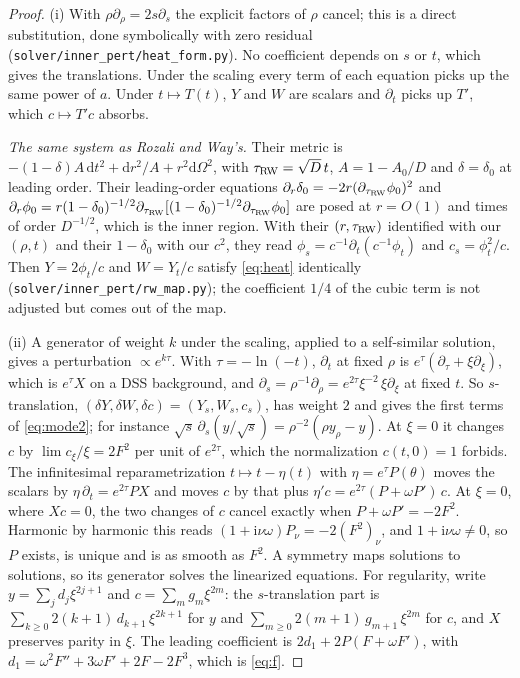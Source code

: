 \documentclass{amsart}
\numberwithin{equation}{section}
\theoremstyle{plain}
\theoremstyle{definition}
\theoremstyle{remark}
\newcommand{\iu}{\mathrm{i}}
\newcommand{\dd}{\mathrm{d}}
\newcommand{\repo}[1]{\texttt{#1}}
\begin{document}
\begin{proof}
(i) With $\rho\partial_\rho = 2s\partial_s$ the explicit factors of $\rho$ cancel; this is a direct substitution, done
symbolically with zero residual (\repo{solver/inner\_pert/heat\_form.py}). No coefficient depends on $s$ or $t$, which
gives the translations. Under the scaling every term of each equation picks up the same power of $a$. Under
$t \mapsto T(t)$, $Y$ and $W$ are scalars and $\partial_t$ picks up $T'$, which $c \mapsto T'c$ absorbs.

\emph{The same system as Rozali and Way's.} Their metric is $-(1-\delta)A\,\dd t^2 + \dd r^2/A + r^2\dd\Omega^2$, with
$\tau_{\rm RW} = \sqrt D\,t$, $A = 1 - A_0/D$ and $\delta = \delta_0$ at leading order. Their leading-order equations
$\partial_r\delta_0 = -2r(\partial_{\tau_{\rm RW}}\phi_0)^2$ and
$\partial_r\phi_0 = r(1-\delta_0)^{-1/2}\partial_{\tau_{\rm RW}}[(1-\delta_0)^{-1/2}\partial_{\tau_{\rm RW}}\phi_0]$ are posed at $r = O(1)$ and
times of order $D^{-1/2}$, which is the inner region. With their $(r, \tau_{\rm RW})$ identified with our $(\rho, t)$ and
their $1 - \delta_0$ with our $c^2$, they read $\phi_s = c^{-1}\partial_t(c^{-1}\phi_t)$ and $c_s = \phi_t^2/c$. Then
$Y = 2\phi_t/c$ and $W = Y_t/c$ satisfy \eqref{eq:heat} identically (\repo{solver/inner\_pert/rw\_map.py}); the coefficient
$1/4$ of the cubic term is not adjusted but comes out of the map.

(ii) A generator of weight $k$ under the scaling, applied to a self-similar solution, gives a perturbation
$\propto e^{k\tau}$. With $\tau = -\ln(-t)$, $\partial_t$ at fixed $\rho$ is $e^{\tau}(\partial_\tau + \xi\partial_\xi)$,
which is $e^\tau X$ on a DSS background, and $\partial_s = \rho^{-1}\partial_\rho = e^{2\tau}\xi^{-2}\,\xi\partial_\xi$ at fixed
$t$. So $s$-translation, $(\delta Y, \delta W, \delta c) = (Y_s, W_s, c_s)$, has weight $2$ and gives the first terms of
\eqref{eq:mode2}; for instance $\sqrt{s}\,\partial_s(y/\sqrt{s}) = \rho^{-2}(\rho y_\rho - y)$. At $\xi = 0$ it changes $c$
by $\lim c_\xi/\xi = 2F^2$ per unit of $e^{2\tau}$, which the normalization $c(t, 0) = 1$ forbids. The infinitesimal
reparametrization $t \mapsto t - \eta(t)$ with $\eta = e^{\tau}P(\theta)$ moves the scalars by
$\eta\,\partial_t = e^{2\tau}P X$ and moves $c$ by that plus $\eta' c = e^{2\tau}(P + \omega P')\,c$. At $\xi = 0$, where
$Xc = 0$, the two changes of $c$ cancel exactly when $P + \omega P' = -2F^2$. Harmonic by harmonic this reads
$(1 + \iu\nu\omega)P_\nu = -2(F^2)_\nu$, and $1 + \iu\nu\omega \ne 0$, so $P$ exists, is unique and is as smooth as $F^2$. A
symmetry maps solutions to solutions, so its generator solves the linearized equations. For regularity, write
$y = \sum_j d_j\xi^{2j+1}$ and $c = \sum_m g_m\xi^{2m}$: the $s$-translation part is
$\sum_{k\ge0} 2(k+1)\,d_{k+1}\,\xi^{2k+1}$ for $y$ and $\sum_{m\ge0} 2(m+1)\,g_{m+1}\,\xi^{2m}$ for $c$, and $X$ preserves parity in
$\xi$. The leading coefficient is $2d_1 + 2P(F + \omega F')$, with $d_1 = \omega^2F'' + 3\omega F' + 2F - 2F^3$, which is
\eqref{eq:f}.


\end{proof}
\end{document}
